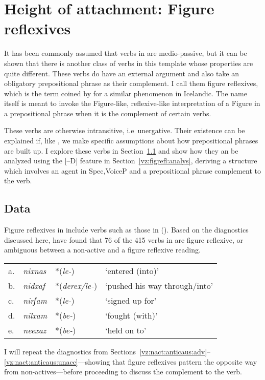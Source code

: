 \section{Height of attachment: Figure reflexives} \label{vz:figrefl}
It has been commonly assumed that verbs in {\tnif} are medio-passive, but it can be shown that there is another class of verbs in this template whose properties are quite different. These verbs do have an external argument and also take an obligatory prepositional phrase as their complement. I call them figure reflexives, which is the term coined by \cite{wood14nllt} for a similar phenomenon in Icelandic. The name itself is meant to invoke the Figure-like, reflexive-like interpretation of a Figure in a prepositional phrase when it is the complement of certain verbs. 

These verbs are otherwise intransitive, i.e~unergative. Their existence can be explained if, like \cite{wood14nllt,wood15springer}, we make specific assumptions about how prepositional phrases are built up. I explore these verbs in Section~\ref{vz:figrefl:data} and show how they an be analyzed using the [--D] feature in Section~\ref{vz:figrefl:analys}, deriving a structure which involves an agent in Spec,VoiceP and a prepositional phrase complement to the verb.

	\subsection{Data} \label{vz:figrefl:data}
Figure reflexives in {\tnif} include verbs such as those in (\nextx). Based on the diagnostics discussed here, \cite{ahdoutkastner18} have found that 76 of the 415 verbs in {\tnif} are figure reflexive, or ambiguous between a non-active and a figure reflexive reading.   
\ex\label{ex:vz:figrefl} \begin{tabular}{l>{\em}lll}
	a.& nixnas &  *(\emph{le-}) & `entered (into)'\\
	b.& nidxaf & *(\emph{derex/le-})  & `pushed his way through/into' \\
	c.& nirʃam & *(\emph{le-})  & `signed up for' \\
	d.& nilxam & *(\emph{be-}) & `fought (with)' \\
	e.& neexaz & *(\emph{be-}) & `held on to' \\
    \end{tabular}
\xe

I will repeat the diagnostics from Sections~\ref{vz:nact:anticaus:adv}--\ref{vz:nact:anticaus:unacc}---showing that figure reflexives pattern the opposite way from non-actives---before proceeding to discuss the complement to the verb.

